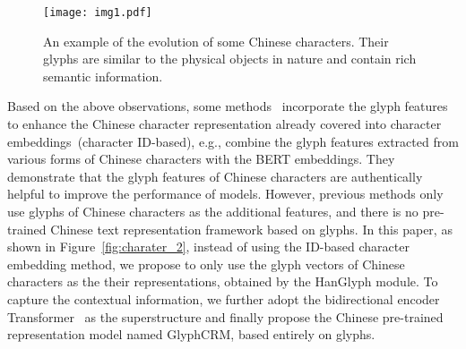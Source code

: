\begin{figure}[t]
    \centering
    \texttt{[image: img1.pdf]}
    \caption{An example of the evolution of some Chinese characters. Their glyphs are similar to the physical objects in nature and contain rich semantic information.}
    \label{fig:charater}
\end{figure}

Based on the above observations, some methods~\cite{learning_glyph, glyce, chen-etal-2020-glyph2vec} incorporate the glyph features to enhance the Chinese character representation already covered into character embeddings~(character ID-based), e.g., \citet{glyce} combine the glyph features extracted from various forms of Chinese characters with the BERT embeddings. They demonstrate that the glyph features of Chinese characters are authentically helpful to improve the performance of models. However, previous methods only use glyphs of Chinese characters as the additional features, and there is no pre-trained Chinese text representation framework based on glyphs. In this paper, as shown in Figure~\ref{fig:charater_2}, instead of using the ID-based character embedding method, we propose to only use the glyph vectors of Chinese characters as the their representations, obtained by the HanGlyph module. To capture the contextual information, we further adopt the bidirectional encoder Transformer~\cite{attention} as the superstructure and finally propose the Chinese pre-trained representation model named GlyphCRM, based entirely on glyphs.





